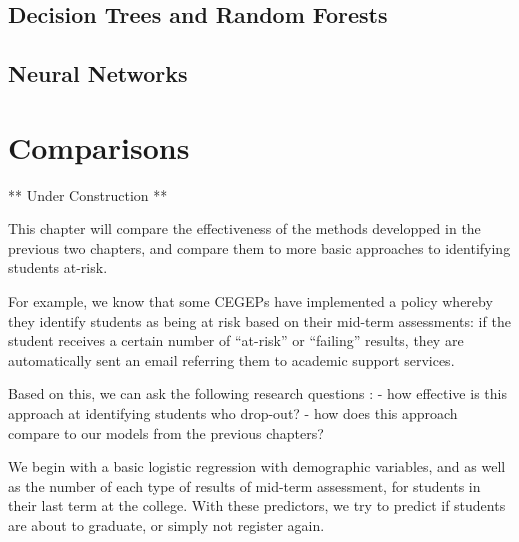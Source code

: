 \documentclass[]{book}
\theoremstyle{definition}
\theoremstyle{definition}
\theoremstyle{remark}
\begin{document}
\section{Decision Trees and Random
Forests}\label{decision-trees-and-random-forests}

\section{Neural Networks}\label{neural-networks}

\hypertarget{comparisons}{\chapter{Comparisons}\label{comparisons}}

** Under Construction **

This chapter will compare the effectiveness of the methods developped in
the previous two chapters, and compare them to more basic approaches to
identifying students at-risk.

For example, we know that some CEGEPs have implemented a policy whereby
they identify students as being at risk based on their mid-term
assessments: if the student receives a certain number of ``at-risk'' or
``failing'' results, they are automatically sent an email referring them
to academic support services.

Based on this, we can ask the following research questions : - how
effective is this approach at identifying students who drop-out? - how
does this approach compare to our models from the previous chapters?

We begin with a basic logistic regression with demographic variables,
and as well as the number of each type of results of mid-term
assessment, for students in their last term at the college. With these
predictors, we try to predict if students are about to graduate, or
simply not register again.
\end{document}
